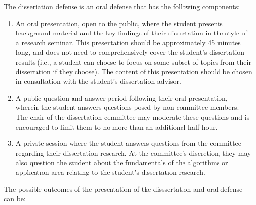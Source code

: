 The dissertation defense is an oral defense that has the following
components:

\begin{enumerate}

\item An oral presentation, open to the public, where the student
  presents background material and the key findings of their
  dissertation in the style of a research seminar.  This presentation
  should be approximately 45 minutes long, and does not need to
  comprehensively cover the student's dissertation results (i.e., a
  student can choose to focus on some subset of topics from their
  dissertation if they choose).  The content of this presentation
  should be chosen in consultation with the student's dissertation advisor.

\item A public question and answer period following their oral
  presentation, wherein the student answers questions posed by
  non-committee members.  The chair of the dissertation committee may
  moderate these questions and is encouraged to limit them to no more
  than an additional half hour.

\item A private session where the student answers questions from the
  committee regarding their dissertation research.  At the committee's
  discretion, they may also question the student about the
  fundamentals of the algorithms or application area relating to the
  student's dissertation research.

\end{enumerate}

The possible outcomes of the presentation of the disssertation and oral defense can be:

